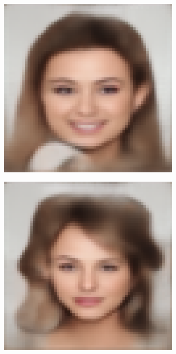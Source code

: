 \documentclass{IEEEcsmag}
\begin{document}
\begin{figure}[ht]
\begin{subfigure}{0.12\textwidth}
    \end{subfigure}
    \begin{subfigure}{0.12\textwidth}
        \includegraphics[width=\linewidth]{Random sketch/generated_images/image2.jpeg_AE.png}
    \end{subfigure}
    \begin{subfigure}{0.12\textwidth}
        \includegraphics[width=\linewidth]{Digital sketches/generated_images/image7.jpeg_AE.png}
    \end{subfigure}


\end{figure}
\end{document}
